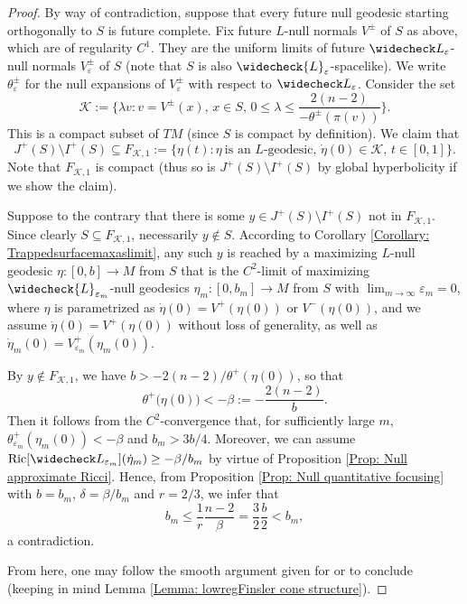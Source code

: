 \documentclass[a4paper,11pt]{article}
\numberwithin{equation}{section}
\theoremstyle{definition}
\theoremstyle{plain}
\newcommand{\eps}{\varepsilon}
\newcommand{\Ric}{\mathrm{Ric}}
\begin{document}
\begin{proof}
By way of contradiction, suppose that every future null geodesic starting orthogonally to $S$ is future complete. 
Fix future $L$-null normals $V^\pm$ of $S$ as above, which are of regularity $C^1$.
They are the uniform limits of future $\widecheck L_\varepsilon$-null normals $V^\pm_\varepsilon$ of $S$ (note that $S$ is also $\widecheck{L}_\eps$-spacelike). 
We write $\theta^\pm_\varepsilon$ for the null expansions of $V^\pm_\eps$ with respect to $\widecheck L_\varepsilon$. 
Consider the set
\[
\mathcal{K} :=\biggl\{ \lambda v : v=V^\pm(x),\, x \in S,\, 0 \le \lambda \le \frac{2(n-2)}{-\theta^\pm(\pi(v))} \biggr\}.
\]
This is a compact subset of $TM$ (since $S$ is compact by definition). 
We claim that
\begin{equation*}
     J^+(S) \setminus I^+(S) \subseteq F_{\mathcal K,1} :=\{ \eta(t) : \eta\ \text{is an $L$-geodesic},\, \dot \eta(0) \in \mathcal K,\, t \in [0,1]\}.
\end{equation*}
Note that $F_{\mathcal{K},1}$ is compact (thus so is $J^+(S) \setminus I^+(S)$ by global hyperbolicity if we show the claim). 

Suppose to the contrary that there is some $y \in J^+(S) \setminus I^+(S)$ not in $F_{\mathcal K , 1}$.
Since clearly $S \subseteq F_{\mathcal{K},1}$, necessarily $y \not\in S$.
According to Corollary \ref{Corollary: Trappedsurfacemaxaslimit}, any such $y$ is reached by a maximizing $L$-null geodesic $\eta:[0,b] \to M$ from $S$ that is the $C^2$-limit of maximizing $\widecheck{L}_{\eps_m}$-null geodesics $\eta_m:[0,b_m] \to M$ from $S$ with $\lim_{m \to \infty}\eps_m =0$, where $\eta$ is parametrized as $\dot{\eta}(0)=V^+(\eta(0))$ or $V^-(\eta(0))$, and we assume $\dot{\eta}(0)=V^+(\eta(0))$ without loss of generality, as well as $\dot{\eta}_m(0)=V^+_{\eps_m}(\eta_m(0))$.

By $y \not\in F_{\mathcal{K},1}$, we have $b>-2(n-2)/\theta^+(\eta(0))$, so that
\[
\theta^+\bigl( \eta(0) \bigr) <-\beta :=-\frac{2(n-2)}{b}.
\]
Then it follows from the $C^2$-convergence that, for sufficiently large $m$, $\theta^+_{\eps_m}(\eta_m(0)) <-\beta$ and $b_m > 3b/4$.
Moreover, we can assume $\Ric[\widecheck L_{\eps_m}](\dot \eta_m) \geq - \beta/b_m$ by virtue of Proposition \ref{Prop: Null approximate Ricci}.
Hence, from Proposition \ref{Prop: Null quantitative focusing} with $b=b_m$, $\delta=\beta/b_m$ and $r=2/3$, we infer that
\[
b_m \leq \frac{1}{r} \frac{n-2}{\beta} =\frac{3}{2} \frac{b}{2} <b_m,
\]
a contradiction.

From here, one may follow the smooth argument given for \cite[Thm.\ 8.4]{LuMinguzziOhtaSingularity} or \cite[Thm.\ 6.25]{Minguzzicausality} to conclude (keeping in mind Lemma \ref{Lemma: lowregFinsler cone structure}).
\end{proof}
\end{document}
